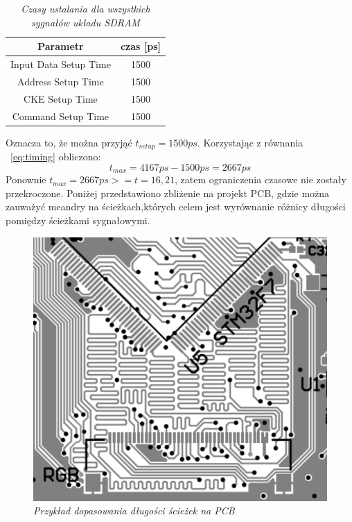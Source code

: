 \documentclass[eng,printmode]{mgr}
\begin{document}
\begin{table}[htb]
\def\arraystretch{1.3}%
\caption{\textit{ Czasy ustalania dla wszystkich sygnałów układu SDRAM}}
\label{tab:sdramTiming}
\begin{center}
\begin{tabular}{ |c|c| }
\hline
Parametr  & czas [ps] \\ 
\hline
Input Data Setup Time & 1500 \\ 
\hline
Address Setup Time & 1500\\ 
\hline
CKE Setup Time	 & 1500\\ 
\hline
Command Setup Time	 & 1500\\ 
\hline
\end{tabular}
\end{center}
\end{table}

Oznacza to, że można przyjąć $t_{setup}=1500ps$. Korzystając z równania ~\ref{eq:timing} obliczono:
$$
t_{max} = 4167ps - 1500ps = 2667ps
$$
Ponownie $t_{max}= 2667ps >= t=16,21$, zatem ograniczenia czasowe nie zostały przekroczone.
Poniżej przedstawiono zbliżenie na projekt PCB, gdzie można zauważyć meandry na ścieżkach,których celem jest wyrównanie różnicy długości pomiędzy ścieżkami sygnałowymi.

\begin{figure}[!h]
    \centering
    \includegraphics[width=\textwidth]{pcb/ltdc.png}
    \caption{\textit{\scriptsize Przykład dopasowania długości ścieżek na PCB}}
\end{figure}
\end{document}

